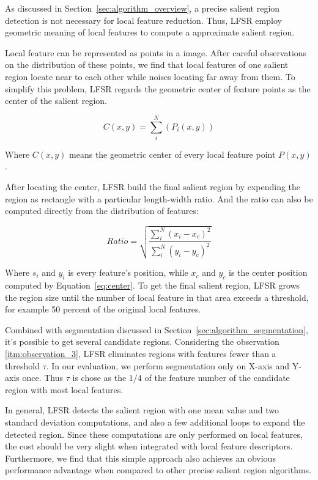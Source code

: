 As discussed in Section~\ref{sec:algorithm_overview}, a precise salient region detection is not necessary for local feature reduction. Thus, LFSR employ geometric meaning of local features to compute a approximate salient region.

Local feature can be represented as points in a image. After careful observations on the distribution of these points, we find that local features of one salient region locate near to each other while noises locating far away from them. To simplify this problem, LFSR regards the geometric center of feature points as the center of the salient region.

{\begin{equation} \label{eq:center}
C(x, y) = \sum_{i}^{N}\left({P}_{i}(x, y) \right)
\end{equation}}

Where $C(x, y)$ means the geometric center of every local feature point $P(x, y)$.

After locating the center, LFSR build the final salient region by expending the region as rectangle with a particular length-width ratio. And the ratio can also be computed directly from the distribution of features:

{\begin{equation} \label{eq:ratio}
Ratio = \sqrt{\frac{\sum_{i}^{N}\left ( x_{i}-x_{c} \right )^{2}}{\sum_{i}^{N}\left ( y_{i}-y_{c} \right )^{2}}}
\end{equation}}

Where $s_{i}$ and $y_{i}$ is every feature's position, while $x_{c}$ and $y_{c}$ is the center position computed by Equation~\ref{eq:center}. To get the final salient region, LFSR grows the region size until the number of local feature in that area exceeds a threshold, for example 50 percent of the original local features.

Combined with segmentation discussed in Section~\ref{sec:algorithm_segmentation}, it's possible to get several candidate regions. Considering the observation \ref{itm:observation_3}, LFSR eliminates regions with features fewer than a threshold $\tau$. In our evaluation, we perform segmentation only on X-axis and Y-axis once. Thus $\tau$ is chose as the $1/4$ of the feature number of the candidate region with most local features.

In general, LFSR detects the salient region with one mean value and two standard deviation computations, and also a few additional loops to expand the detected region. Since these computations are only performed on local features, the cost should be very slight when integrated with local feature descriptors. Furthermore, we find that this simple approach also achieves an obvious performance advantage when compared to other precise salient region algorithms.